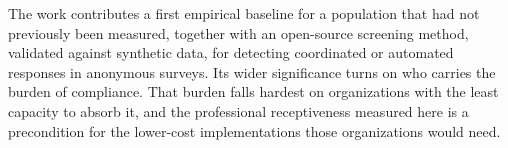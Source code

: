 The work contributes a first empirical baseline for a population that had not previously been measured, together with an open-source screening method, validated against synthetic data, for detecting coordinated or automated responses in anonymous surveys. Its wider significance turns on who carries the burden of compliance. That burden falls hardest on organizations with the least capacity to absorb it, and the professional receptiveness measured here is a precondition for the lower-cost implementations those organizations would need.
\clearpage
